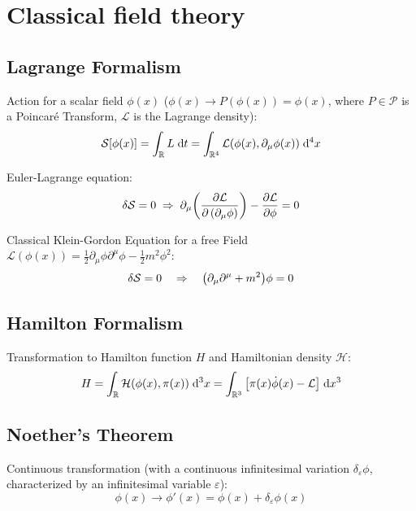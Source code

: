 \section{Classical field theory}
	\subsection{Lagrange Formalism}
		\noindent 
		Action for a scalar field $\phi(x)$ (\ie $\phi(x)\rightarrow P(\phi(x))=\phi(x)$, where $P\in\mathcal{P}$ is a Poincaré Transform, $\mathcal{L}$ is the Lagrange density):
		\begin{equation}
			\mathcal{S}\qty[\phi(x)] = \int_{\mathbb{R}} L \;\dd t = \int_{\mathbb{R}^4} \mathcal{L}(\phi(x),\partial_\mu \phi(x)) \;\dd^4 x				
		\end{equation}
		
		\noindent
		Euler-Lagrange equation:
		\begin{equation}
			\delta\mathcal{S} = 0
			\;\Rightarrow\; \partial_\mu \qty(\pdv{\mathcal{L}}{\left(\partial_\mu \phi\right)}) - \pdv{\mathcal{L}}{\phi} = 0
		\end{equation}
		
		\noindent
		Classical Klein-Gordon Equation for a free Field $\mathcal{L}(\phi(x)) = \frac{1}{2} \partial_\mu\phi \partial^\mu\phi - \frac{1}{2}m^2\phi^2$:
		\begin{equation}
			\delta \mathcal{S} = 0 \quad \Rightarrow \quad \qty(\partial_\mu \partial^\mu + m^2)\phi = 0
		\end{equation}


	\subsection{Hamilton Formalism}
		\noindent
		Transformation to Hamilton function $H$ and Hamiltonian density $\mathcal{H}$:
		\begin{equation}
			H = \int_{\mathbb{R}} \mathcal{H}(\phi(x),\pi(x)) \;\dd^3 x = \int_{\mathbb{R}^3} \qty[\pi(x)\dot{\phi}(x) - \mathcal{L}] \;\dd x^3
		\end{equation}

	\subsection{Noether's Theorem}
		\noindent
		Continuous transformation (with a continuous infinitesimal variation $\delta_\varepsilon \phi$, characterized by an infinitesimal variable $\varepsilon$):
		\begin{equation}
			\phi(x)\rightarrow\phi'(x) = \phi(x) + \delta_\varepsilon \phi(x)
		\end{equation}
		
